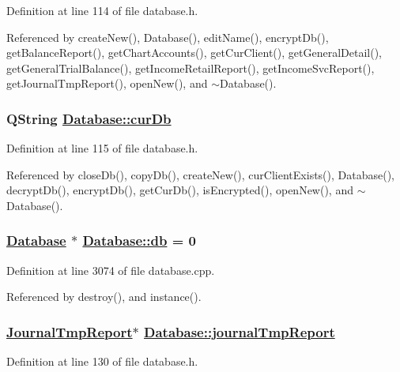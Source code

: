 Definition at line 114 of file database.h.

Referenced by create\-New(), Database(), edit\-Name(), encrypt\-Db(), get\-Balance\-Report(), get\-Chart\-Accounts(), get\-Cur\-Client(), get\-General\-Detail(), get\-General\-Trial\-Balance(), get\-Income\-Retail\-Report(), get\-Income\-Svc\-Report(), get\-Journal\-Tmp\-Report(), open\-New(), and $\sim$Database().\hypertarget{classDatabase_r4}{
\subsubsection[curDb]{\setlength{\rightskip}{0pt plus 5cm}QString \hyperlink{classDatabase_r4}{Database::cur\-Db}}}
\label{classDatabase_r4}


Definition at line 115 of file database.h.

Referenced by close\-Db(), copy\-Db(), create\-New(), cur\-Client\-Exists(), Database(), decrypt\-Db(), encrypt\-Db(), get\-Cur\-Db(), is\-Encrypted(), open\-New(), and $\sim$Database().\hypertarget{classDatabase_v0}{
\subsubsection[db]{\setlength{\rightskip}{0pt plus 5cm}\hyperlink{classDatabase}{Database} $\ast$ \hyperlink{classDatabase_v0}{Database::db} = 0}}
\label{classDatabase_v0}


Definition at line 3074 of file database.cpp.

Referenced by destroy(), and instance().\hypertarget{classDatabase_r6}{
\subsubsection[journalTmpReport]{\setlength{\rightskip}{0pt plus 5cm}\hyperlink{structDatabase_1_1JournalTmpReport}{Journal\-Tmp\-Report}$\ast$ \hyperlink{classDatabase_r6}{Database::journal\-Tmp\-Report}}}
\label{classDatabase_r6}


Definition at line 130 of file database.h.

